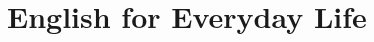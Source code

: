 \documentclass[
    12pt,
    a4paper,
    oneside,
    openany
]{book}
\begin{document}



\part{English for Everyday Life}

\end{document}
